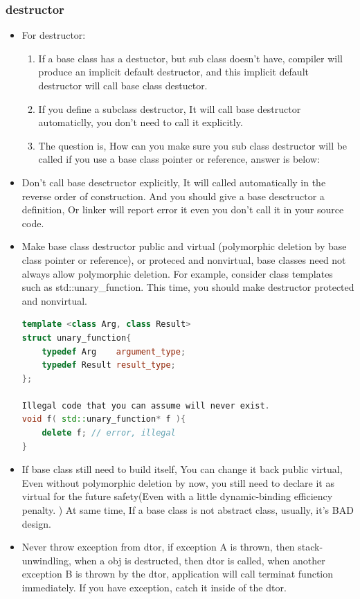 \documentclass[a4paper,11pt,twoside]{book}
\begin{document}
\subsubsection{destructor}
\begin{itemize}
	\item For destructor:
	\begin{enumerate}
		\item If a base class has a destuctor, but sub class doesn't have,  compiler will produce an implicit default destructor, and this implicit default destructor will call base class destuctor.
		
		\item If you define a subclass destructor, It will call base destructor automaticlly, you don't need to call it explicitly.
		
		\item The question is, How can you make sure you sub class destructor will be called if you use a base class pointer or reference, answer is below:
	\end{enumerate}
	
	\item Don't call base desctructor explicitly, It will called automatically in the reverse order of construction.  And you should give a base desctructor a definition, Or linker will report error it even you don't call it in your source code.
	
	\item Make base class destructor public and virtual (polymorphic deletion by base class pointer or reference), or proteced and nonvirtual, base classes need not always allow polymorphic deletion. For example, consider class templates such as std::unary\_function. This time, you should make destructor protected and nonvirtual.
\begin{lstlisting}[frame=single, language=c++]
template <class Arg, class Result>
struct unary_function{
	typedef Arg    argument_type;
	typedef Result result_type;
};
	
Illegal code that you can assume will never exist.
void f( std::unary_function* f ){
	delete f; // error, illegal
}
\end{lstlisting}
	
	\item If base class still need to build itself, You can change it back public virtual,  Even without polymorphic deletion by now, you still need to declare it as virtual for the future safety(Even with a little dynamic-binding efficiency penalty. ) At same time, If a base class is not abstract class, usually, it's BAD design.
	
	\item Never throw exception from dtor, if exception A is thrown, then stack-unwindling, when a obj is destructed, then dtor is called, when another exception B is thrown by the dtor, application will call terminat function immediately.  If you have exception, catch it inside of the dtor.
	
\end{itemize}
\end{document}
